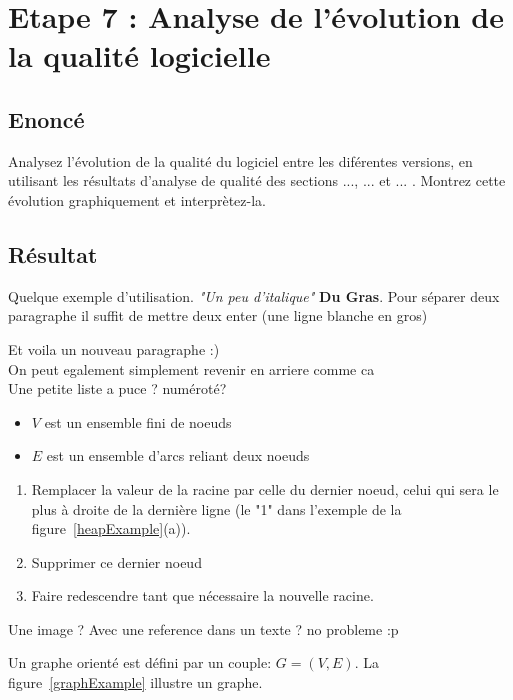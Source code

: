 \documentclass[12pt,a4paper,final]{article}
\begin{document}
\section{Etape 7 : Analyse de l'évolution de la qualité logicielle}\label{sec:etape7}
\subsection{Enoncé} 
Analysez l'évolution de la qualité du logiciel entre les diférentes versions, en utilisant les résultats d'analyse de qualité des sections ..., ... et ... . Montrez cette évolution graphiquement et interprètez-la.
\subsection{Résultat}







Quelque exemple d'utilisation. \textit{"Un peu d'italique"} \textbf{Du Gras}. Pour séparer deux paragraphe il suffit de mettre deux enter (une ligne blanche en gros)

Et voila un nouveau paragraphe :)\\
On peut egalement simplement revenir en arriere comme ca \\

Une petite liste a puce ? numéroté?

\begin{itemize}
\item $V$ est un ensemble fini de noeuds
\item $E$ est un ensemble d'arcs reliant deux noeuds
\end{itemize}

\begin{enumerate}
\item Remplacer la valeur de la racine par celle du dernier noeud, celui qui sera le plus à droite de la dernière ligne (le "1" dans l'exemple de la figure~\ref{heapExample}(a)).
\item Supprimer ce dernier noeud
\item Faire redescendre tant que nécessaire la nouvelle racine.
\end{enumerate}
Une image ? Avec une reference dans un texte ? no probleme :p

Un graphe orienté est défini par un couple: $G=(V,E)$.
La figure~\ref{graphExample} illustre un graphe.
\end{document}
